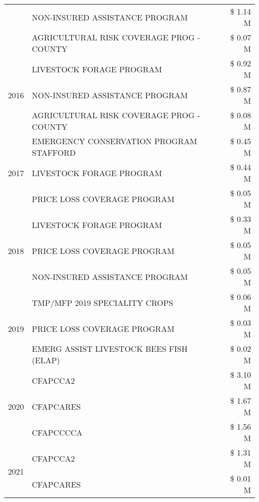 \begin{tabular}{llr}
 & NON-INSURED ASSISTANCE PROGRAM & \$ 1.14 M \\
 & AGRICULTURAL RISK COVERAGE PROG - COUNTY & \$ 0.07 M \\
\cline{1-3}
\multirow[t]{3}{*}{2016} & LIVESTOCK FORAGE PROGRAM                      & \$ 0.92 M \\
 & NON-INSURED ASSISTANCE PROGRAM                & \$ 0.87 M \\
 & AGRICULTURAL RISK COVERAGE PROG - COUNTY      & \$ 0.08 M \\
\cline{1-3}
\multirow[t]{3}{*}{2017} & EMERGENCY CONSERVATION PROGRAM STAFFORD & \$ 0.45 M \\
 & LIVESTOCK FORAGE PROGRAM & \$ 0.44 M \\
 & PRICE LOSS COVERAGE PROGRAM & \$ 0.05 M \\
\cline{1-3}
\multirow[t]{3}{*}{2018} & LIVESTOCK FORAGE PROGRAM & \$ 0.33 M \\
 & PRICE LOSS COVERAGE PROGRAM & \$ 0.05 M \\
 & NON-INSURED ASSISTANCE PROGRAM & \$ 0.05 M \\
\cline{1-3}
\multirow[t]{3}{*}{2019} & TMP/MFP 2019 SPECIALITY CROPS & \$ 0.06 M \\
 & PRICE LOSS COVERAGE PROGRAM & \$ 0.03 M \\
 & EMERG ASSIST LIVESTOCK BEES FISH (ELAP) & \$ 0.02 M \\
\cline{1-3}
\multirow[t]{3}{*}{2020} & CFAPCCA2 & \$ 3.10 M \\
 & CFAPCARES & \$ 1.67 M \\
 & CFAPCCCCA & \$ 1.56 M \\
\cline{1-3}
\multirow[t]{2}{*}{2021} & CFAPCCA2 & \$ 1.31 M \\
 & CFAPCARES & \$ 0.01 M \\
\cline{1-3}
\bottomrule
\end{tabular}
